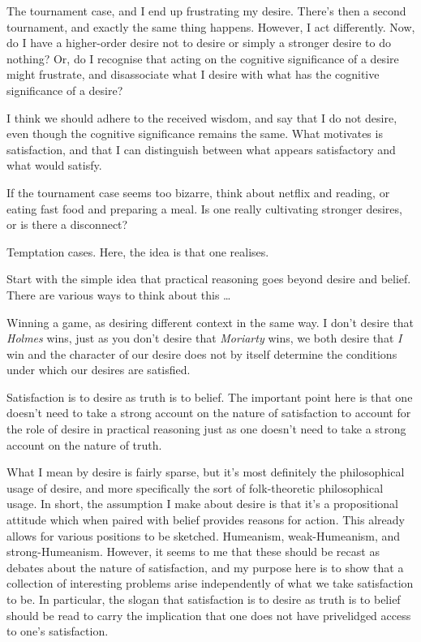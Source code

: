 \documentclass[10pt]{article}
\begin{document}
The tournament case, and I end up frustrating my desire.
There's then a second tournament, and exactly the same thing happens.
However, I act differently.
Now, do I have a higher-order desire not to desire or simply a stronger desire to do nothing?
Or, do I recognise that acting on the cognitive significance of a desire might frustrate, and disassociate what I desire with what has the cognitive significance of a desire?

I think we should adhere to the received wisdom, and say that I do not desire, even though the cognitive significance remains the same.
What motivates is satisfaction, and that I can distinguish between what appears satisfactory and what would satisfy.

If the tournament case seems too bizarre, think about netflix and reading, or eating fast food and preparing a meal.
Is one really cultivating stronger desires, or is there a disconnect?

Temptation cases.
Here, the idea is that one realises.








Start with the simple idea that practical reasoning goes beyond desire and belief.
There are various ways to think about this \dots



Winning a game, as desiring different context in the same way.
I don't desire that \emph{Holmes} wins, just as you don't desire that \emph{Moriarty} wins, we both desire that \emph{I} win and the character of our desire does not by itself determine the conditions under which our desires are satisfied.



Satisfaction is to desire as truth is to belief.
The important point here is that one doesn't need to take a strong account on the nature of satisfaction to account for the role of desire in practical reasoning just as one doesn't need to take a strong account on the nature of truth.

What I mean by desire is fairly sparse, but it's most definitely the philosophical usage of desire, and more specifically the sort of folk-theoretic philosophical usage.
In short, the assumption I make about desire is that it's a propositional attitude which when paired with belief provides reasons for action.
This already allows for various positions to be sketched.
Humeanism, weak-Humeanism, and strong-Humeanism.
However, it seems to me that these should be recast as debates about the nature of satisfaction, and my purpose here is to show that a collection of interesting problems arise independently of what we take satisfaction to be.
In particular, the slogan that satisfaction is to desire as truth is to belief should be read to carry the implication that one does not have privelidged access to one's satisfaction.
\end{document}
